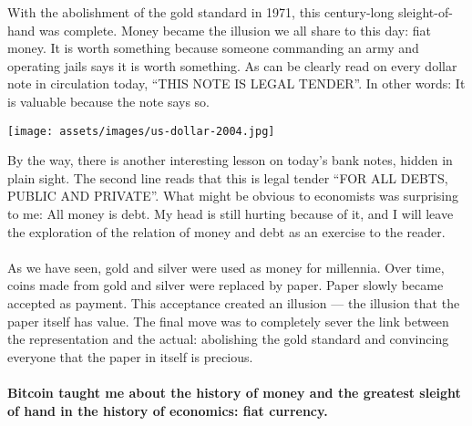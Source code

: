 With the abolishment of the gold standard in 1971, this century-long
sleight-of-hand was complete. Money became the illusion we all share to
this day: fiat money. It is worth something because someone commanding
an army and operating jails says it is worth something. As can be
clearly read on every dollar note in circulation today, \enquote{THIS NOTE IS
LEGAL TENDER}. In other words: It is valuable because the note says so.

\begin{center}
  \centering
  \texttt{[image: assets/images/us-dollar-2004.jpg]}
  \label{fig:us-dollar-2004}
\end{center}

By the way, there is another interesting lesson on today's bank notes,
hidden in plain sight. The second line reads that this is legal tender
\enquote{FOR ALL DEBTS, PUBLIC AND PRIVATE}. What might be obvious to economists
was surprising to me: All money is debt. My head is still hurting
because of it, and I will leave the exploration of the relation of money
and debt as an exercise to the reader.

\paragraph{}
As we have seen, gold and silver were used as money for millennia. Over
time, coins made from gold and silver were replaced by paper. Paper
slowly became accepted as payment. This acceptance created an
illusion --- the illusion that the paper itself has value. The final
move was to completely sever the link between the representation and the
actual: abolishing the gold standard and convincing everyone that the
paper in itself is precious.

\paragraph{Bitcoin taught me about the history of money and the greatest sleight of
hand in the history of economics: fiat currency.}

%
%
%
%

